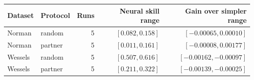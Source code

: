 \begin{tabular}{llrrr}
\toprule
Dataset & Protocol & Runs & Neural skill range & Gain over simpler range \\
\midrule
Norman & random & 5 & $[0.082, 0.158]$ & $[-0.00065, 0.00010]$ \\
Norman & partner & 5 & $[0.011, 0.161]$ & $[-0.00008, 0.00177]$ \\
Wessels & random & 5 & $[0.507, 0.616]$ & $[-0.00162, -0.00097]$ \\
Wessels & partner & 5 & $[0.211, 0.322]$ & $[-0.00139, -0.00025]$ \\
\bottomrule
\end{tabular}
